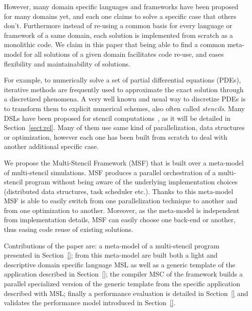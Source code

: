 However, many domain specific languages and frameworks have been proposed for many domains yet, and each one claims to solve a specific case that others don't. Furthermore instead of re-using a common basis for every language or framework of a same domain, each solution is implemented from scratch as a monolithic code. We claim in this paper that being able to find a common meta-model for all solutions of a given domain facilitates code re-use, and eases flexibility and maintainability of solutions. 

For example, to numerically solve a set of partial differential equations (PDEs), iterative methods are frequently used to approximate the exact solution through a discretized phenomena. A very well known and usual way to discretize PDEs is to transform them to explicit numerical schemes, also often called \emph{stencils}. Many DSLs have been proposed for stencil computations~\cite{spaaTangCKLL11,citeulike12258902,Ragan-Kelley:2013:HLC:2491956.2462176,DeVito:2011:LDS:2063384.2063396,Camier:2015:IPP:2820083.2820107}, as it will be detailed in Section~\ref{sect:rel}. Many of them use same kind of parallelization, data structures or optimization, however each one has been built from scratch to deal with another additional specific case. 

We propose the Multi-Stencil Framework (MSF) that is built over a meta-model of multi-stencil simulations. MSF produces a parallel orchestration of a multi-stencil program without being aware of the underlying implementation choices (\eg distributed data structures, task scheduler etc.). Thanks to this meta-model MSF is able to easily switch from one parallelization technique to another and from one optimization to another. Moreover, as the meta-model is independent from implementation details, MSF can easily choose one back-end or another, thus easing code reuse of existing solutions.

Contributions of the paper are: a meta-model of a multi-stencil program presented in Section~\ref{}; from this meta-model are built both a light and descriptive domain specific language MSL as well as a generic template of the application described in Section~\ref{}; the compiler MSC of the framework builds a parallel specialized version of the generic template from the specific application described with MSL; finally a performance evaluation is detailed in Section~\ref{}  and validates the performance model introduced in Section~\ref{}.

